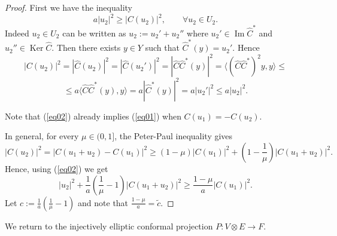 \documentclass[12pt]{amsart} %
\theoremstyle{definition}
\numberwithin{equation}{section}
\DeclareMathOperator{\Ker}{Ker}
\DeclareMathOperator{\Imag}{Im}
\newcommand{\ra}{\rightarrow}
\begin{document}
\begin{proof} First we have the inequality
\begin{equation} \label{eq02}a|u_2|^ 2\geq |C(u_2)|^ 2,\qquad \forall u_2\in U_2. \end{equation}
Indeed  $u_2\in U_2$ can be written as $u_2:=u_2'+u_2''$ where $u_2' \in \Imag \hat{C}^ *$ and $u_2''\in \Ker\hat{C}$. Then there exists $y\in Y$ such that $\hat{C}^ *(y)=u_2'$. Hence
\[ |C(u_2)|^ 2=|\hat{C}(u_2)|^ 2=|\hat{C}(u_2')|^ 2=|\hat{C}\hat{C}^ *(y)|^ 2=\langle (\hat{C}\hat{C}^ *)^ 2y,y\rangle\leq\]\[\leq  a\langle \hat{C}\hat{C}^* (y),y\rangle=a|\hat{C}^ *(y)|^ 2=a|u_2'|^ 2\leq a|u_2|^ 2.\]

Note that (\ref{eq02}) already implies (\ref{eq01}) when $C(u_1)=-C(u_2)$.

In general, for every $\mu\in (0,1]$, the  Peter-Paul inequality gives
\[|C(u_2)|^ 2= |C(u_1+u_2)-C(u_1)|^ 2\geq (1-\mu) |C(u_1)|^ 2+(1-\frac{1}{\mu})|C(u_1+u_2)|^ 2.\]
Hence, using (\ref{eq02}) we get
\[ |u_2|^ 2+ \frac{1}{a}\left(\frac{1}{\mu}-1\right)|C(u_1+u_2)|^ 2\geq \frac{1-\mu}{a}|C(u_1)|^ 2.\]
Let $c:=\frac{1}{a}\left(\frac{1}{\mu}-1\right)$ and note that $\frac{1-\mu}{a}=\tilde{c}$.
\end{proof}
We return to the injectively elliptic conformal projection $P:V\otimes E\ra F$.
\end{document}
